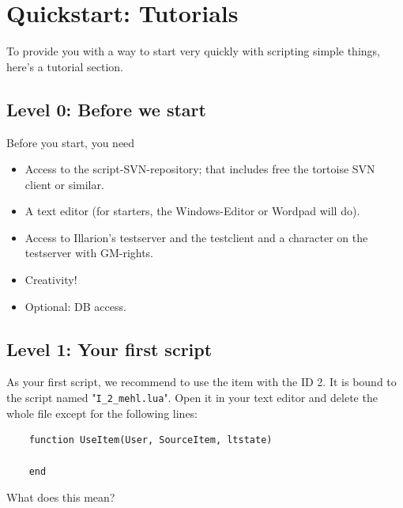 \documentclass[a4paper,10pt,makeidx]{scrreprt}
\begin{document}
\chapter{Quickstart: Tutorials}
To provide you with a way to start very quickly with scripting simple things, here's a tutorial section.

\section{Level 0: Before we start}
Before you start, you need
\begin{itemize}
    \item Access to the script-SVN-repository; that includes free the tortoise SVN client or similar.
    \item A text editor (for starters, the Windows-Editor or Wordpad will do).
    \item Access to Illarion's testserver and the testclient and a character on the testserver with GM-rights.
    \item Creativity!
    \item Optional: DB access.
\end{itemize}

\section{Level 1: Your first script}
As your first script, we recommend to use the item with the ID 2. It is bound to the script named "{\tt I\_2\_mehl.lua}". Open it in your text editor and delete the whole file except for the following lines:
\begin{verbatim}
    function UseItem(User, SourceItem, ltstate)

    end
\end{verbatim}
What does this mean?
\end{document}
